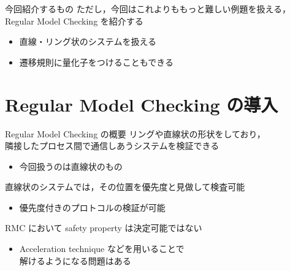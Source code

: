 \documentclass[presentation, xetex]{beamer}
\begin{document}
\begin{frame}[label={sec:orgee95449}]{今回紹介するもの}
ただし，今回はこれよりももっと難しい例題を扱える，\\
Regular Model Checking を紹介する
\begin{itemize}
\item 直線・リング状のシステムを扱える
\item 遷移規則に量化子をつけることもできる
\end{itemize}
\end{frame}


\section{Regular Model Checking の導入}
\label{sec:org9c2017b}

\begin{frame}[label={sec:orgc30ce08}]{Regular Model Checking の概要}
リングや直線状の形状をしており，\\
隣接したプロセス間で通信しあうシステムを検証できる
\begin{itemize}
\item 今回扱うのは直線状のもの
\end{itemize}



直線状のシステムでは，その位置を優先度と見做して検査可能
\begin{itemize}
\item 優先度付きのプロトコルの検証が可能
\end{itemize}


\hspace{1em}

RMC において \alert{\alert{safety property は決定可能ではない}}
\begin{itemize}
\item Acceleration technique などを用いることで\\
解けるようになる問題はある
\end{itemize}
\end{frame}
\end{document}
